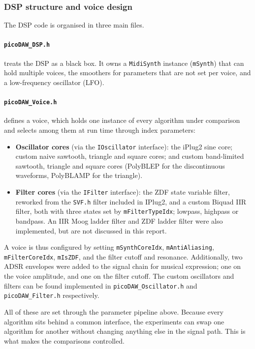 \subsubsection{DSP structure and voice design}
\label{sec:voice}
\noindent
The DSP code is organised in three main files.

\paragraph{\texttt{picoDAW\_DSP.h}} treats the DSP as a black box. It owns a \texttt{MidiSynth} instance (\texttt{mSynth}) that can hold multiple voices, the smoothers for parameters that are not set per voice, and a low-frequency oscillator (LFO).

\paragraph{\texttt{picoDAW\_Voice.h}} defines a voice, which holds one instance of every algorithm under comparison and selects among them at run time through index parameters:
\begin{itemize}
  \item \textbf{Oscillator cores} (via the \texttt{IOscillator} interface): the iPlug2 sine core; custom naive sawtooth, triangle and square cores; and custom band-limited sawtooth, triangle and square cores (PolyBLEP for the discontinuous waveforms, PolyBLAMP for the triangle).
  \item \textbf{Filter cores} (via the \texttt{IFilter} interface): the ZDF state variable filter, reworked from the \texttt{SVF.h} filter included in IPlug2, and a custom Biquad IIR filter, both with three states set by \texttt{mFilterTypeIdx}; lowpass, highpass or bandpass. An IIR Moog ladder filter and ZDF ladder filter were also implemented, but are not discussed in this report.
\end{itemize}
A voice is thus configured by setting \texttt{mSynthCoreIdx}, \texttt{mAntiAliasing}, \texttt{mFilterCoreIdx}, \texttt{mIsZDF}, and the filter cutoff and resonance. Additionally, two ADSR envelopes were added to the signal chain for musical expression; one on the voice amplitude, and one on the filter cutoff. The custom oscillators and filters can be found implemented in \texttt{picoDAW\_Oscillator.h} and \texttt{picoDAW\_Filter.h} respectively.

All of these are set through the parameter pipeline above. Because every algorithm sits behind a common interface, the experiments can swap one algorithm for another without changing anything else in the signal path. This is what makes the comparisons controlled.

